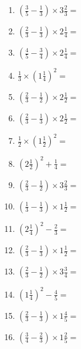 \documentclass[12pt]{article}
\begin{document}
\begin{enumerate}
\item \large $ \left( \frac{3}{5} - \frac{1}{3} \right) \times 3 \frac{2}{3} = $ \vspace{1.6cm}
\item \large $ \left( \frac{2}{3} - \frac{1}{3} \right) \times 2 \frac{1}{4} = $ \vspace{1.6cm}
\item \large $ \left( \frac{4}{5} - \frac{3}{4} \right) \times 2 \frac{1}{4} = $ \vspace{1.6cm}
\item \large $ \frac{1}{3} \times \left( 1 \frac{1}{4} \right)^2 = $ \vspace{1.6cm}
\newpage
\item \large $ \left( \frac{2}{3} - \frac{1}{2} \right) \times 2 \frac{1}{2} = $ \vspace{1.6cm}
\item \large $ \left( \frac{2}{3} - \frac{1}{3} \right) \times 2 \frac{1}{2} = $ \vspace{1.6cm}
\item \large $ \frac{1}{2} \times \left( 1 \frac{1}{2} \right)^2 = $ \vspace{1.6cm}
\item \large $ \left( 2 \frac{1}{2} \right)^2 + \frac{1}{4} = $ \vspace{1.6cm}
\item \large $ \left( \frac{2}{3} - \frac{1}{2} \right) \times 3 \frac{2}{3} = $ \vspace{1.6cm}
\item \large $ \left( \frac{1}{3} - \frac{1}{3} \right) \times 1 \frac{1}{2} = $ \vspace{1.6cm}
\item \large $ \left( 2 \frac{1}{4} \right)^2 - \frac{2}{3} = $ \vspace{1.6cm}
\item \large $ \left( \frac{2}{3} - \frac{1}{3} \right) \times 1 \frac{1}{2} = $ \vspace{1.6cm}
\item \large $ \left( \frac{2}{3} - \frac{1}{2} \right) \times 3 \frac{3}{4} = $ \vspace{1.6cm}
\item \large $ \left( 1 \frac{1}{4} \right)^2 - \frac{4}{5} = $ \vspace{1.6cm}
\newpage
\item \large $ \left( \frac{2}{3} - \frac{1}{3} \right) \times 1 \frac{4}{5} = $ \vspace{1.6cm}
\item \large $ \left( \frac{3}{4} - \frac{2}{3} \right) \times 1 \frac{2}{5} = $ \vspace{1.6cm}

\end{enumerate}
\end{document}
